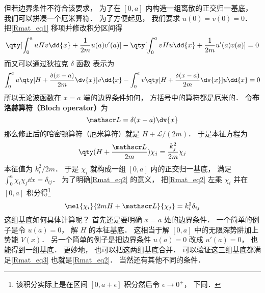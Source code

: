 但若边界条件不符合该要求， 为了在 $[0,a]$ 内构造一组离散的正交归一基底， 我们可以拼凑一个厄米算符． 为了方便起见， 我们要求 $u(0) = v(0) = 0$． 把\autoref{Rmat_eq1} 移项并修改积分区间得
\begin{equation}
\qty[\int_{0}^{a} uHv\dd{x} + \frac{1}{2m}u(a)v'(a)] - \qty[\int_{0}^{a} vHu\dd{x} + \frac{1}{2m}u'(a)v(a)]
= 0
\end{equation}
而又可以通过狄拉克 $\delta$ 函数 表示为
\begin{equation}
\int_{0}^{a} u\qty[H + \frac{\delta(x-a)}{2m}\dv{x}] v\dd{x} -
\int_{0}^{a} v\qty[H + \frac{\delta(x-a)}{2m}\dv{x}] u\dd{x} = 0
\end{equation}
所以无论波函数在 $x=a$ 端的边界条件如何， 方括号中的算符都是厄米的． 令\textbf{布洛赫算符（Bloch operator）}为
\begin{equation}
\mathscr L = \delta(x-a)\dv{x}
\end{equation}
那么修正后的哈密顿算符（厄米算符）就是 $H + \mathscr L/(2m)$． 于是本征方程为
\begin{equation}\label{Rmat_eq2}
\qty(H + \frac{\mathscr L}{2m})\chi_j = \frac{k_j^2}{2m} \chi_j
\end{equation}
本征值为 ${k_i^2}/{2m}$． 于是 $\chi_i$ 就构成一组 $[0, a]$ 内的正交归一基底， 满足 $\int_0^a \chi_i \chi_j \dd{x} = \delta_{ij}$． 为了明确\autoref{Rmat_eq2} 的意义， 把\autoref{Rmat_eq2} 左乘 $\chi_i$ 并在 $[0,a]$ 积分得\footnote{该积分实际上是在区间 $[0,a+\epsilon]$ 积分然后令 $\epsilon\to 0^+$， 下同．}
\begin{equation}\label{Rmat_eq3}
\mel{\chi_i}{2mH + \mathscr L}{\chi_j} = k_i^2 \delta_{ij}
\end{equation}
这组基底如何具体计算呢？ 首先还是要明确 $x=a$ 处的边界条件． 一个简单的例子是令 $u(a) = 0$， 解 $H$ 的本征基底． 这相当于解 $[0,a]$ 中的无限深势阱加上势能 $V(x)$． 另一个简单的例子是把边界条件 $u(a) = 0$ 改成 $u'(a) = 0$， 也能得到一组基底． 更妙地， 也可以把这两组基底合并． 可以验证这三组基底都满足\autoref{Rmat_eq3} 也就是\autoref{Rmat_eq2}． 当然还有其他不同的条件．

